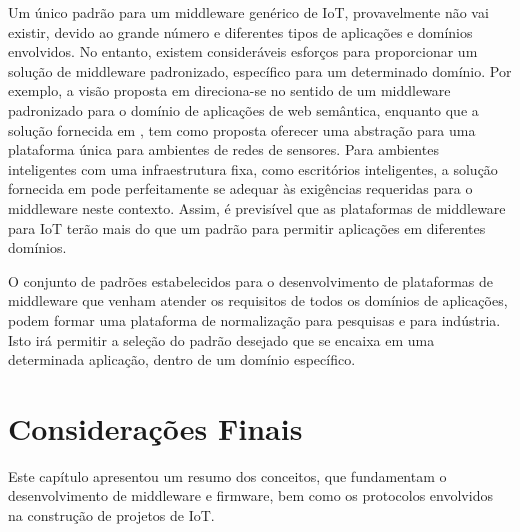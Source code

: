 Um único padrão para um middleware genérico de IoT, provavelmente
não vai existir, devido ao grande número e diferentes tipos de aplicações
e domínios envolvidos. No entanto, existem consideráveis esforços
para proporcionar um solução de middleware padronizado, específico
para um determinado domínio. Por exemplo, a visão proposta em \cite{Katasonov2008}
direciona-se no sentido de um middleware padronizado para o domínio
de aplicações de web semântica, enquanto que a solução fornecida em
\cite{hauswirth2006middleware}, tem como proposta oferecer uma abstração
para uma plataforma única para ambientes de redes de sensores. Para
ambientes inteligentes com uma infraestrutura fixa, como escritórios
inteligentes, a solução fornecida em \cite{roalter2010middleware}
pode perfeitamente se adequar às exigências requeridas para o middleware
neste contexto. Assim, é previsível que as plataformas de middleware
para IoT terão mais do que um padrão para permitir aplicações em diferentes
domínios. 

O conjunto de padrões estabelecidos para o desenvolvimento de plataformas
de middleware que venham atender os requisitos de todos os domínios
de aplicações, podem formar uma plataforma de normalização para pesquisas
e para indústria. Isto irá permitir a seleção do padrão desejado que
se encaixa em uma determinada aplicação, dentro de um domínio específico.


\section{Considerações Finais }

Este capítulo apresentou um resumo dos conceitos, que fundamentam
o desenvolvimento de middleware e firmware, bem como os protocolos
envolvidos na construção de projetos de IoT. 
